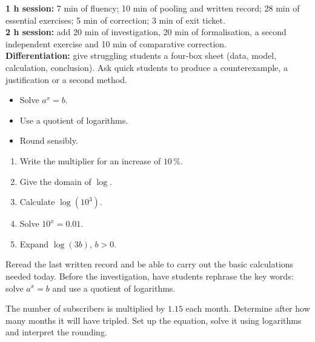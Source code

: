 \ifprof\clearpage
\begin{methode}
\textbf{1 h session:} 7 min of fluency; 10 min of pooling and written record; 28 min of essential exercises; 5 min of correction; 3 min of exit ticket.\\
\textbf{2 h session:} add 20 min of investigation, 20 min of formalisation, a second independent exercise and 10 min of comparative correction.\\
\textbf{Differentiation:} give struggling students a four-box sheet (data, model, calculation, conclusion). Ask quick students to produce a counterexample, a justification or a second method.
\end{methode}
\fi
{}
\begin{objectifs}\begin{itemize}\item Solve $a^x=b$.\item Use a quotient of logarithms.\item Round sensibly.\end{itemize}\end{objectifs}
\begin{automatismes}\begin{enumerate}\item Write the multiplier for an increase of $10\,\%$. \item Give the domain of $\log$. \rep{$]0,+\infty[$}\item Calculate $\log(10^3)$. \item Solve $10^x=0.01$. \item Expand $\log(3b)$, $b>0$. \end{enumerate}\end{automatismes}
\begin{prerequis}Reread the last written record and be able to carry out the basic calculations needed today. Before the investigation, have students rephrase the key words: solve $a^x=b$ and use a quotient of logarithms.\end{prerequis}

\begin{activite}
The number of subscribers is multiplied by $1.15$ each month. Determine after how many months it will have tripled. Set up the equation, solve it using logarithms and interpret the rounding.

\end{activite}


